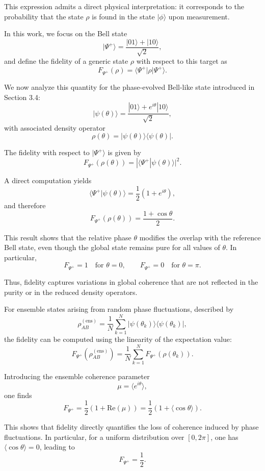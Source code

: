 \documentclass[a4paper]{article}
\begin{document}
This expression admits a direct physical interpretation: it corresponds to the probability that the state $\rho$ is found in the state $|\phi\rangle$ upon measurement.

\medskip

In this work, we focus on the Bell state
\[
|\Psi^+\rangle = \frac{|01\rangle + |10\rangle}{\sqrt{2}},
\]
and define the fidelity of a generic state $\rho$ with respect to this target as
\[
F_{\Psi^+}(\rho)
=
\langle \Psi^+ | \rho | \Psi^+ \rangle.
\]

\medskip

We now analyze this quantity for the phase-evolved Bell-like state introduced in Section 3.4:
\[
|\psi(\theta)\rangle = \frac{|01\rangle + e^{i\theta}|10\rangle}{\sqrt{2}},
\]
with associated density operator
\[
\rho(\theta) = |\psi(\theta)\rangle\langle\psi(\theta)|.
\]

The fidelity with respect to $|\Psi^+\rangle$ is given by
\[
F_{\Psi^+}(\rho(\theta))
=
|\langle \Psi^+ | \psi(\theta) \rangle|^2.
\]

A direct computation yields
\[
\langle \Psi^+ | \psi(\theta) \rangle
=
\frac{1}{2}(1 + e^{i\theta}),
\]
and therefore
\[
F_{\Psi^+}(\rho(\theta))
=
\frac{1 + \cos\theta}{2}.
\]

\medskip

This result shows that the relative phase $\theta$ modifies the overlap with the reference Bell state, even though the global state remains pure for all values of $\theta$. In particular,
\[
F_{\Psi^+} = 1 \quad \text{for } \theta = 0,
\qquad
F_{\Psi^+} = 0 \quad \text{for } \theta = \pi.
\]

Thus, fidelity captures variations in global coherence that are not reflected in the purity or in the reduced density operators.

\medskip
For ensemble states arising from random phase fluctuations, described by
\[
\rho_{AB}^{(\mathrm{ens})}
=
\frac{1}{N}\sum_{k=1}^{N}
|\psi(\theta_k)\rangle\langle\psi(\theta_k)|,
\]
the fidelity can be computed using the linearity of the expectation value:
\[
F_{\Psi^+}(\rho_{AB}^{(\mathrm{ens})})
=
\frac{1}{N}
\sum_{k=1}^{N}
F_{\Psi^+}(\rho(\theta_k)).
\]

Introducing the ensemble coherence parameter
\[
\mu = \langle e^{i\theta} \rangle,
\]
one finds
\[
F_{\Psi^+}
=
\frac{1}{2}\left(1 + \mathrm{Re}(\mu)\right)
=
\frac{1}{2}\left(1 + \langle \cos\theta \rangle\right).
\]

\medskip

This shows that fidelity directly quantifies the loss of coherence induced by phase fluctuations. In particular, for a uniform distribution over $[0,2\pi]$, one has $\langle \cos\theta \rangle = 0$, leading to
\[
F_{\Psi^+} = \frac{1}{2}.
\]
\end{document}

